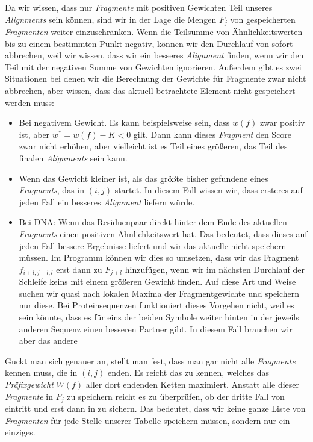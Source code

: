 Da wir wissen, dass nur \emph{Fragmente} mit positiven Gewichten Teil unseres \emph{Alignments} sein können, sind wir in der Lage die Mengen $F_j$ von gespeicherten \emph{Fragmenten} weiter einzuschränken. Wenn die Teilsumme von Ähnlichkeitswerten bis zu einem bestimmten Punkt negativ, können wir den Durchlauf von  sofort abbrechen, weil wir wissen, dass wir ein besseres \emph{Alignment} finden, wenn wir den Teil mit der negativen Summe von Gewichten ignorieren. Außerdem gibt es zwei Situationen bei denen wir die Berechnung der Gewichte für Fragmente zwar nicht abbrechen, aber wissen, dass das aktuell betrachtete Element nicht gespeichert werden muss:

\begin{itemize}
	\item Bei negativem Gewicht. Es kann beispielsweise sein, dass $w(f)$ zwar positiv ist, aber $w^* = w(f)-K < 0$ gilt. Dann kann dieses \emph{Fragment} den Score zwar nicht erhöhen, aber vielleicht ist es Teil eines größeren, das Teil des finalen \emph{Alignments} sein kann.
	\item Wenn das Gewicht kleiner ist, als das größte bisher gefundene eines \emph{Fragments}, das in $(i,j)$ startet. In diesem Fall wissen wir, dass ersteres auf jeden Fall ein besseres \emph{Alignment} liefern würde.
	\item Bei DNA: Wenn das Residuenpaar direkt hinter dem Ende des aktuellen \emph{Fragments} einen positiven Ähnlichkeitswert hat. Das bedeutet, dass dieses auf jeden Fall bessere Ergebnisse liefert und wir das aktuelle nicht speichern müssen. Im Programm können wir dies so umsetzen, dass wir das Fragment $f_{i+l,j+l,l}$ erst dann zu $F_{j+l}$ hinzufügen, wenn wir im nächsten Durchlauf der Schleife  keins mit einem größeren Gewicht finden. Auf diese Art und Weise suchen wir quasi nach lokalen Maxima der Fragmentgewichte und speichern nur diese. Bei Proteinsequenzen funktioniert dieses Vorgehen nicht, weil es sein könnte, dass es für eins der beiden Symbole weiter hinten in der jeweils anderen Sequenz einen besseren Partner gibt. In diesem Fall brauchen wir aber das andere 
\end{itemize}

Guckt man sich  genauer an, stellt man fest, dass man gar nicht alle \emph{Fragmente} kennen muss, die in $(i,j)$ enden. Es reicht das zu kennen, welches das \emph{Präfixgewicht} $W(f)$ aller dort endenden Ketten maximiert. Anstatt alle dieser \emph{Fragmente} in $F_j$ zu speichern reicht es zu überprüfen, ob der dritte Fall von  eintritt und erst dann in  zu sichern. Das bedeutet, dass wir keine ganze Liste von \emph{Fragmenten} für jede Stelle unserer Tabelle speichern müssen, sondern nur ein einziges.

